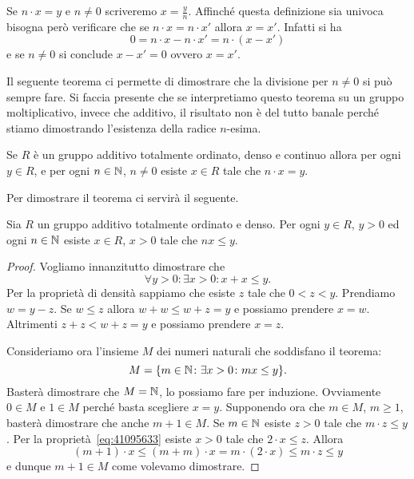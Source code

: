 Se $n\cdot x = y$ e $n\neq 0$ scriveremo $x=\frac y n$. 
Affinché questa definizione sia univoca bisogna però verificare che 
se $n\cdot x = n\cdot x'$ allora $x=x'$.
Infatti si ha 
\[
  0 = n\cdot x - n\cdot x' = n\cdot (x-x')
\]
e se $n\neq 0$ si conclude $x-x'=0$ ovvero $x=x'$.

Il seguente teorema ci permette di dimostrare che la divisione per $n\neq 0$ 
si può sempre fare.
Si faccia presente che se interpretiamo questo teorema su un 
gruppo moltiplicativo, invece che additivo, il risultato
non è del tutto banale perché 
stiamo dimostrando l'esistenza della radice $n$-esima.

\begin{theorem}[divisibilità]
\label{th:divisibile}%
Se $R$ è un gruppo additivo totalmente ordinato, denso e continuo
allora per ogni $y\in R$, e per ogni $n\in {\mathbb N}$, $n\neq 0$ 
esiste $x\in R$ tale che $n\cdot x = y$.
\end{theorem}
%
Per dimostrare il teorema ci servirà il seguente.
%
\begin{lemma}
  \label{lm:numeri_piccoli}%
Sia $R$ un gruppo additivo totalmente ordinato e denso.
Per ogni $y\in R$, $y>0$ ed ogni $n\in {\mathbb N}$ esiste $x\in R$, 
$x>0$ tale che $nx\le y$.
\end{lemma}
%
\begin{proof}
Vogliamo innanzitutto dimostrare che 
\begin{equation}\label{eq:41095633}
  \forall y>0 \colon \exists x>0 \colon x+x \le y.
\end{equation}
Per la proprietà di densità sappiamo che esiste $z$ tale che 
$0<z<y$. 
Prendiamo $w=y-z$. Se $w\le z$ allora $w+w\le w+z=y$ e possiamo prendere $x=w$.
Altrimenti $z+z < w+z = y$ e possiamo prendere $x=z$.

Consideriamo ora l'insieme $M$ dei numeri naturali che 
soddisfano il teorema:
\[
  M = {\left\{ m\in {\mathbb N}\colon \exists x>0\colon mx\le y \right\}}.
\]
Basterà dimostrare che $M={\mathbb N}$, lo possiamo fare per induzione.
Ovviamente $0\in M$ e $1\in M$ perché basta scegliere $x=y$.
Supponendo ora che $m\in M$, $m\ge 1$, basterà dimostrare che anche $m+1\in M$.
Se $m\in {\mathbb N}$ esiste $z>0$ tale che $m\cdot z\le y$.
Per la proprietà~\eqref{eq:41095633} esiste $x>0$ tale che $2\cdot x\le z$.
Allora 
\[
  (m+1)\cdot x 
  \le (m+m)\cdot x 
  = m\cdot(2\cdot x)
  \le m\cdot z \le y
\]
e dunque $m+1\in M$ come volevamo dimostrare.
\end{proof}
